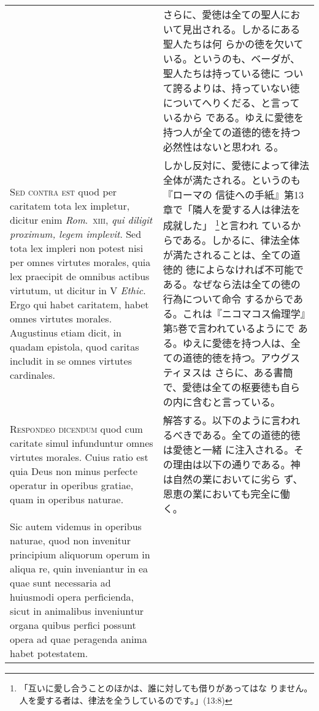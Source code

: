 \documentclass[10pt]{jsarticle}
\begin{document}
\begin{longtable}{p{21em}p{21em}}
 
&

 さらに、愛徳は全ての聖人において見出される。しかるにある聖人たちは何
 らかの徳を欠いている。というのも、ベーダが、聖人たちは持っている徳に
 ついて誇るよりは、持っていない徳についてへりくだる、と言っているから
 である。ゆえに愛徳を持つ人が全ての道徳的徳を持つ必然性はないと思われ
 る。

\\




 {\scshape Sed contra est} quod per caritatem tota lex impletur,
 dicitur enim {\itshape Rom}.~{\scshape xiii}, {\itshape qui diligit
 proximum, legem implevit}. Sed tota lex impleri non potest nisi per
 omnes virtutes morales, quia lex praecipit de omnibus actibus
 virtutum, ut dicitur in V {\itshape Ethic}. Ergo qui habet caritatem,
 habet omnes virtutes morales. Augustinus etiam dicit, in quadam
 epistola, quod caritas includit in se omnes virtutes cardinales.
 
&

 しかし反対に、愛徳によって律法全体が満たされる。というのも『ローマの
 信徒への手紙』第13章で「隣人を愛する人は律法を成就した」
 \footnote{「互いに愛し合うことのほかは、誰に対しても借りがあってはな
 りません。人を愛する者は、律法を全うしているのです。」(13:8)}と言われ
 ているからである。しかるに、律法全体が満たされることは、全ての道徳的
 徳によらなければ不可能である。なぜなら法は全ての徳の行為について命令
 するからである。これは『ニコマコス倫理学』第5巻で言われているようにで
 ある。ゆえに愛徳を持つ人は、全ての道徳的徳を持つ。アウグスティヌスは
 さらに、ある書簡で、愛徳は全ての枢要徳も自らの内に含むと言っている。

\\


 {\scshape Respondeo dicendum} quod cum caritate simul infunduntur
 omnes virtutes morales. Cuius ratio est quia Deus non minus perfecte
 operatur in operibus gratiae, quam in operibus naturae.

 
&

 解答する。以下のように言われるべきである。全ての道徳的徳は愛徳と一緒
 に注入される。その理由は以下の通りである。神は自然の業においてに劣ら
 ず、恩恵の業においても完全に働く。

\\


 Sic autem videmus in operibus naturae, quod non invenitur principium
 aliquorum operum in aliqua re, quin inveniantur in ea quae sunt
 necessaria ad huiusmodi opera perficienda, sicut in animalibus
 inveniuntur organa quibus perfici possunt opera ad quae peragenda
 anima habet potestatem.
 

\end{longtable}
\end{document}
